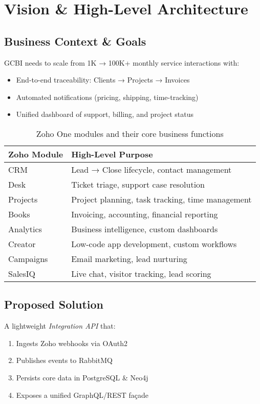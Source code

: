 \section{Vision \& High-Level Architecture}

\subsection{Business Context \& Goals}
GCBI needs to scale from 1K → 100K+ monthly service interactions with:
\begin{itemize}
  \item End-to-end traceability: Clients → Projects → Invoices
  \item Automated notifications (pricing, shipping, time-tracking)
  \item Unified dashboard of support, billing, and project status
\end{itemize}

\begin{table}[h]
\centering
\begin{tabular}{|l|l|}
\hline
\textbf{Zoho Module} & \textbf{High-Level Purpose} \\
\hline
CRM & Lead → Close lifecycle, contact management \\
\hline
Desk & Ticket triage, support case resolution \\
\hline
Projects & Project planning, task tracking, time management \\
\hline
Books & Invoicing, accounting, financial reporting \\
\hline
Analytics & Business intelligence, custom dashboards \\
\hline
Creator & Low-code app development, custom workflows \\
\hline
Campaigns & Email marketing, lead nurturing \\
\hline
SalesIQ & Live chat, visitor tracking, lead scoring \\
\hline
\end{tabular}
\caption{Zoho One modules and their core business functions}
\end{table}

\subsection{Proposed Solution}
A lightweight \emph{Integration API} that:
\begin{enumerate}
  \item Ingests Zoho webhooks via OAuth2
  \item Publishes events to RabbitMQ
  \item Persists core data in PostgreSQL \& Neo4j
  \item Exposes a unified GraphQL/REST façade
\end{enumerate}

